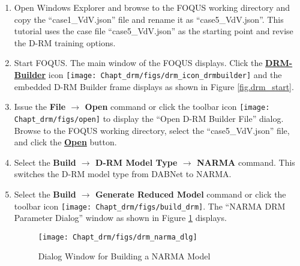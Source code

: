 \begin{enumerate}
	\item Open Windows Explorer and browse to the FOQUS working directory and copy the ``case1\_VdV.json'' file and rename it as ``case5\_VdV.json''.  This tutorial uses the case file ``case5\_VdV.json'' as the starting point and revise the D-RM training options.
	\item Start FOQUS.  The main window of the FOQUS displays.  Click the \textbf{\underline{DRM-Builder}} icon \texttt{[image: Chapt\_drm/figs/drm\_icon\_drmbuilder]} and the embedded D-RM Builder frame displays as shown in Figure \ref{fig.drm_start}.
	\item Issue the \textbf{File $\rightarrow$ Open} command or click the toolbar icon \texttt{[image: Chapt\_drm/figs/open]} to display the ``Open D-RM Builder File'' dialog. Browse to the FOQUS working directory, select the ``case5\_VdV.json'' file, and click the \textbf{\underline{Open}} button.
	\item Select the \textbf{Build $\rightarrow$ D-RM Model Type $\rightarrow$ NARMA} command.  This switches the D-RM model type from DABNet to NARMA.
	\item Select the \textbf{Build $\rightarrow$ Generate Reduced Model} command or click the toolbar icon \texttt{[image: Chapt\_drm/figs/build\_drm]}.  The ``NARMA DRM Parameter Dialog'' window as shown in Figure \ref{fig.drm_narma_dlg} displays.
	\begin{figure}[H]
		\begin{center}
			\texttt{[image: Chapt\_drm/figs/drm\_narma\_dlg]}
			\caption{Dialog Window for Building a NARMA Model}
			\label{fig.drm_narma_dlg}
		\end{center}
	\end{figure}

\end{enumerate}
